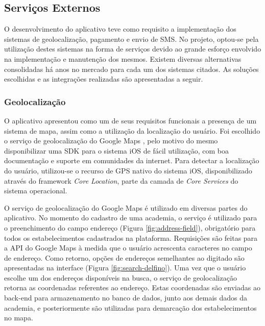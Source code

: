 \subsection{Serviços Externos}
O desenvolvimento do aplicativo teve como requisito a implementação dos sistemas de geolocalização, pagamento e envio de SMS. No projeto, optou-se pela utilização destes sistemas na forma de serviços devido ao grande esforço envolvido na implementação e manutenção dos mesmos. Existem diversas alternativas consolidadas há anos no mercado para cada um dos sistemas citados. As soluções escolhidas e as integrações realizadas são apresentadas a seguir. 

\subsubsection{Geolocalização}
O aplicativo apresentou como um de seus requisitos funcionais a presença de um sistema de mapa, assim como a utilização da localização do usuário. Foi escolhido o serviço de geolocalização do Google Maps , pelo motivo do mesmo disponibilizar uma SDK para o sistema iOS de fácil utilização, com boa documentação e suporte em comunidades da internet. Para detectar a localização do usuário, utilizou-se o recurso de GPS nativo do sistema iOS, disponibilizado através do framework \textit{Core Location}, parte da camada de \textit{Core Services} do sistema operacional.

O serviço de geolocalização do Google Maps é utilizado em diversas partes do aplicativo. No momento do cadastro de uma academia, o serviço é utilizado para o preenchimento do campo endereço (Figura \ref{fig:address-field}), obrigatório para todos os estabelecimentos cadastrados na plataforma. Requisições são feitas para a API do Google Maps à medida que o usuário acrescenta caracteres no campo de endereço. Como retorno, opções de endereços semelhantes ao digitado são apresentadas na interface (Figura \ref{fig:search-delfino}). Uma vez que o usuário escolhe um dos endereços disponíveis na busca, o serviço de geolocalização retorna as coordenadas referentes ao endereço. Estas coordenadas são enviadas ao back-end para armazenamento no banco de dados, junto aos demais dados da academia, e posteriormente são utilizadas para demarcação dos estabelecimentos no mapa.

